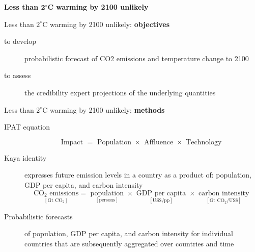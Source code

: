 \documentclass[notes,blackandwhite,mathsans,usenames,dvipsnames]{beamer}
\begin{document}
{
\begin{frame}

\begin{adjustwidth}{-0.5cm}{0cm}
\vspace{8.3cm}\Large
\textbf{{\color{blu}Less than $\mathbf{2^{\circ}}$C warming by 2100} {\color{gre}unlikely}}
\end{adjustwidth}

\end{frame}
}




\begin{frame}{Less than $2^{\circ}$C warming by 2100 unlikely: \textbf{objectives}}

\begin{description}
\item[to develop] probabilistic forecast of CO2 emissions and temperature change to 2100

\bigskip\item[to assess] the credibility expert projections of the underlying quantities
\end{description}
\end{frame}




\begin{frame}{Less than $2^{\circ}$C warming by 2100 unlikely: \textbf{methods}}

\begin{description}
\item[IPAT equation] 
$$
\text{Impact } = \text{ Population } \times\text{ Affluence } \times\text{ Technology }
$$

\bigskip\item[Kaya identity] {\color{gre}expresses future emission levels in a country as a product of: population, GDP per capita, and carbon intensity} \small
$$
\underset{[\text{Gt CO}_2]}{\text{CO}_2\text{ emissions}} =\underset{[\text{persons}]}{\text{ population }} \times \underset{[\text{US\$/pp}]}{\text{ GDP per capita }} \times \underset{[\text{Gt CO}_2\text{/US\$}]}{\text{ carbon intensity }}
$$

\bigskip\item[Probabilistic forecasts] of population, GDP per capita, and carbon intensity for individual countries that are subsequently aggregated over countries and time 

\end{description}
\end{frame}
\end{document}

